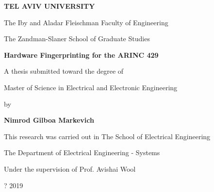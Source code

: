 \begin{titlepage}
\begin{center}
  \vspace*{1cm}
  
  \Large
  \textbf{TEL AVIV UNIVERSITY}
  
  \normalsize
  The Iby and Aladar Fleischman Faculty of Engineering
  
  The Zandman-Slaner School of Graduate Studies
  
  \vspace{0.5cm}
  \LARGE
  \textbf{Hardware Fingerprinting for the ARINC 429}
  
  \vspace{0.5cm}
  
  \vspace{1cm}
  \normalsize
   A thesis submitted toward the degree of
   
   Master of Science in Electrical and Electronic Engineering
   
   \vspace{0.5cm}
   by
   
  \Large
  \textbf{Nimrod Gilboa Markevich}
  
  \vspace{1 cm}
  \normalsize
  This research was carried out in The School of Electrical Engineering
  
  The Department of Electrical Engineering - Systems
  
  Under the supervision of Prof. Avishai Wool
  
  \vspace{0.5cm}
  \large
  ? 2019
  
\end{center}
\end{titlepage}
